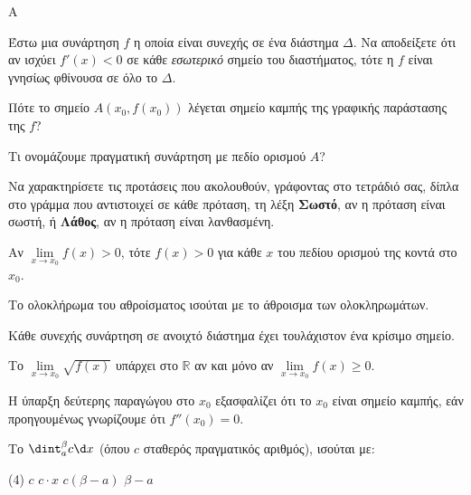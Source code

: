 \begin{thema}{A}
\begin{erwthma}
    \item Έστω μια συνάρτηση $ f $ η οποία είναι συνεχής σε ένα διάστημα $ \varDelta $. Να αποδείξετε ότι αν ισχύει $ f'(x)<0 $ σε κάθε \textit{εσωτερικό} σημείο του διαστήματος, τότε η $ f $ είναι γνησίως φθίνουσα σε όλο το $ \varDelta $.
    \item Πότε το σημείο $A(x_0, f(x_0))$ λέγεται σημείο καμπής της γραφικής παράστασης της $f$?
    \item Τι ονομάζουμε πραγματική συνάρτηση με πεδίο ορισμού $A$?
    \item Να χαρακτηρίσετε τις προτάσεις που ακολουθούν, γράφοντας στο τετράδιό σας, δίπλα στο γράμμα που αντιστοιχεί σε κάθε πρόταση, τη λέξη \textbf{Σωστό}, αν η πρόταση είναι σωστή, ή \textbf{Λάθος}, αν η πρόταση είναι λανθασμένη.
    \begin{alist}
        \item Αν $\lim\limits_{x \to x_0} f(x) > 0$, τότε $f(x) > 0$ για κάθε $x$ του πεδίου ορισμού της κοντά στο $x_0$.
        \item Το ολοκλήρωμα του αθροίσματος ισούται με το άθροισμα των ολοκληρωμάτων.
        \item Κάθε συνεχής συνάρτηση σε ανοιχτό διάστημα έχει τουλάχιστον ένα κρίσιμο σημείο.
        \item Το $\lim\limits_{x \to x_0} \sqrt{f(x)}$ υπάρχει στο $\mathbb{R}$ αν και μόνο αν $\lim\limits_{x \to x_0} f(x) \ge 0$.
        \item Η ύπαρξη δεύτερης παραγώγου στο $x_0$ εξασφαλίζει ότι το $x_0$ είναι σημείο καμπής, εάν προηγουμένως γνωρίζουμε ότι $f''(x_0)=0$.
    \end{alist}
    \item Το $\dint_a^\beta c \d x$ (όπου $c$ σταθερός πραγματικός αριθμός), ισούται με:
    \begin{tasks}[label=\let\textdexiakeraia\relax\alph*.](4)
        \task $c$
        \task $c\cdot x$
        \task $c(\beta - a)$
        \task $\beta - a$
    \end{tasks}
\end{erwthma}
\end{thema}


